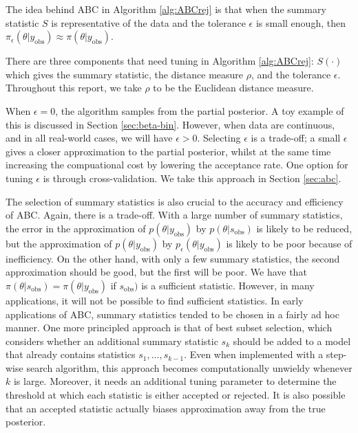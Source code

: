 \documentclass[a4paper,10pt]{article}
\begin{document}
The idea behind ABC in Algorithm \ref{alg:ABCrej} is that when the summary statistic $S$ is representative of the data and the tolerance $\epsilon$ is small enough, then $\pi_{\epsilon}(\theta | y_\textrm{obs}) \approx \pi(\theta | y_\textrm{obs})$.

There are three components that need tuning in Algorithm \ref{alg:ABCrej}: $S(\cdot)$ which gives the summary statistic, the distance measure $\rho$, and the tolerance $\epsilon$. Throughout this report, we take $\rho$ to be the Euclidean distance measure. 

When $\epsilon = 0$, the algorithm samples from the partial posterior. A toy example of this is discussed in Section \ref{sec:beta-bin}. However, when data are continuous, and in all real-world cases, we will have $\epsilon > 0$. Selecting $\epsilon$ is a trade-off; a small $\epsilon$ gives a closer approximation to the partial posterior, whilst at the same time increasing the compuational cost by lowering the acceptance rate. One option for tuning $\epsilon$ is through cross-validation. We take this approach in Section \ref{sec:abc}.

The selection of summary statistics is also crucial to the accuracy and efficiency of ABC. Again, there is a trade-off. With a large number of summary statistics, the error in the approximation of $p(\theta | y_\textrm{obs})$ by $p(\theta | s_\textrm{obs})$ is likely to be reduced, but the approximation of $p(\theta | y_\textrm{obs})$ by $p_\epsilon(\theta | y_\textrm{obs})$ is likely to be poor because of inefficiency. On the other hand, with only a few summary statistics, the second approximation should be good, but the first will be poor. We have that $\pi(\theta | s_\textrm{obs}) = \pi(\theta | y_\textrm{obs})$ if $s_\textrm{obs})$ is a sufficient statistic. However, in many applications, it will not be possible to find sufficient statistics. In early applications of ABC, summary statistics tended to be chosen in a fairly ad hoc manner. One more principled approach is that of best subset selection, which considers whether an additional summary statistic $s_k$ should be added to a model that already contains statistics $s_1, \ldots, s_{k-1}$. Even when implemented with a step-wise search algorithm, this approach becomes computationally unwieldy whenever $k$ is large. Moreover, it needs an additional tuning parameter to determine the threshold at which each statistic is either accepted or rejected. It is also possible that an accepted statistic actually biases approximation away from the true posterior.
\end{document}
